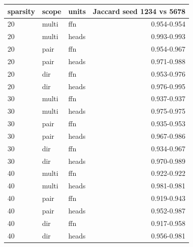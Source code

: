 \begin{tabular}{lllr}
\toprule
sparsity & scope & units & Jaccard seed 1234 vs 5678 \\
\midrule
20 & multi & ffn & 0.954-0.954 \\
20 & multi & heads & 0.993-0.993 \\
20 & pair & ffn & 0.954-0.967 \\
20 & pair & heads & 0.971-0.988 \\
20 & dir & ffn & 0.953-0.976 \\
20 & dir & heads & 0.976-0.995 \\
30 & multi & ffn & 0.937-0.937 \\
30 & multi & heads & 0.975-0.975 \\
30 & pair & ffn & 0.935-0.953 \\
30 & pair & heads & 0.967-0.986 \\
30 & dir & ffn & 0.934-0.967 \\
30 & dir & heads & 0.970-0.989 \\
40 & multi & ffn & 0.922-0.922 \\
40 & multi & heads & 0.981-0.981 \\
40 & pair & ffn & 0.919-0.943 \\
40 & pair & heads & 0.952-0.987 \\
40 & dir & ffn & 0.917-0.958 \\
40 & dir & heads & 0.956-0.981 \\
\bottomrule
\end{tabular}
